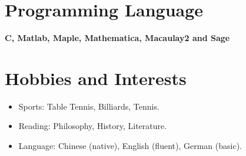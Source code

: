 \documentclass[a4paper,12pt]{article}
\begin{document}
\section*{\Large{Programming Language}}
\vspace{.05in}
{\bf C, Matlab, Maple, Mathematica, Macaulay2 and Sage}

\section*{\Large{Hobbies and Interests}}
\begin{itemize}
 \item Sports: Table Tennis, Billiards, Tennis.
 \item Reading: Philosophy, History, Literature.
 \item Language: Chinese (native), English (fluent), German (basic).
\end{itemize}
\end{document}
